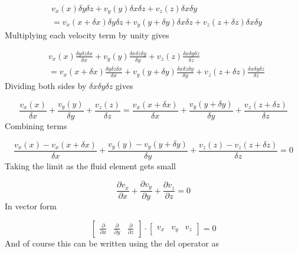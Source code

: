 \begin{equation*}
  \begin{split}
    &v_{x}(x)\delta y\delta z+v_{y}(y)\delta x\delta z+v_{z}(z)\delta x\delta y \\
    &=v_{x}(x+\delta x)\delta y\delta z+v_{y}(y+\delta y)\delta x\delta z+v_{z}(z+\delta z)\delta x\delta y
  \end{split}
\end{equation*}
Multiplying each velocity term by unity gives

\begin{equation*}
  \begin{split}
    &v_{x}(x)\frac{\delta y\delta z\delta x}{\delta x}+v_{y}(y)\frac{\delta x\delta z\delta y}{\delta y}+v_{z}(z)\frac{\delta x\delta y\delta z}{\delta z} \\
    &=v_{x}(x+\delta x)\frac{\delta y\delta z\delta x}{\delta x}+v_{y}(y+\delta y)\frac{\delta x\delta z\delta y}{\delta y}+v_{z}(z+\delta z)\frac{\delta x\delta y\delta z}{\delta z}
  \end{split}
\end{equation*}
Dividing both sides by $\delta x\delta y\delta z$ gives

\begin{equation*}
  \frac{v_{x}(x)}{\delta x}+\frac{v_{y}(y)}{\delta y}+\frac{v_{z}(z)}{\delta z}=\frac{v_{x}(x+\delta x)}{\delta x}+\frac{v_{y}(y+\delta y)}{\delta y}+\frac{v_{z}(z+\delta z)}{\delta z}
\end{equation*}
Combining terms

\begin{equation*}
  \frac{v_{x}(x)-v_{x}(x+\delta x)}{\delta x}+\frac{v_{y}(y)-v_{y}(y+\delta y)}{\delta y}+\frac{v_{z}(z)-v_{z}(z+\delta z)}{\delta z}=0
\end{equation*}
Taking the limit as the fluid element gets small

\begin{equation*}
  \frac{\partial{}v_{x}}{\partial{}x}+\frac{\partial{}v_{y}}{\partial{}y}+\frac{\partial{}v_{z}}{\partial{}z}=0
\end{equation*}
In vector form

\begin{equation*}
  \begin{bmatrix}
    \frac{\partial}{\partial{}x} &
    \frac{\partial}{\partial{}y} &
    \frac{\partial}{\partial{}z}
  \end{bmatrix}
  \cdot
  \begin{bmatrix}
    v_{x} &
    v_{y} &
    v_{z}
  \end{bmatrix}
  =0
\end{equation*}
And of course this can be written using the del operator as


